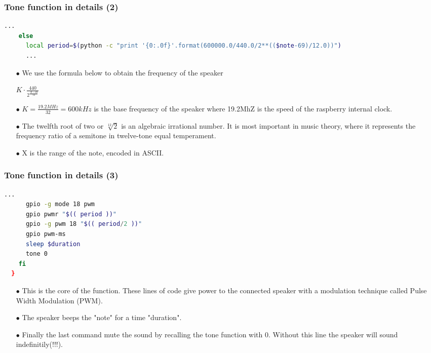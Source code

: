\documentclass{beamer}
\begin{document}

\begin{frame}[fragile]
	\frametitle{\textbf{Tone function in details (2)}}
  \begin{lstlisting}[language=bash]
    ...
    else
      local period=$(python -c "print '{0:.0f}'.format(600000.0/440.0/2**(($note-69)/12.0))")
      ...
  \end{lstlisting}
  \begin{itemize}
  	\item[$\bullet$] We use the formula below to obtain the frequency of the speaker
  	
  	\begin{center}
  			$K\cdot\frac{440}{2^{\frac{X-69}{12}}}$
  	\end{center}
  		
  	
  	\item[$\bullet$] $K =\frac{19.2MHz}{32} = 600kHz$ is the base frequency of the speaker where 19.2MhZ is the speed of the raspberry internal clock.
  	\item[$\bullet$] The twelfth root of two or $\sqrt[12]{2}$ is an algebraic irrational number. It is most important in music theory, where it represents the frequency ratio of a semitone in twelve-tone equal temperament.
  	\item[$\bullet$] X is the range of the note, encoded in ASCII.
  \end{itemize}
\end{frame}



\begin{frame}[fragile]
	\frametitle{\textbf{Tone function in details (3)}}
  \begin{lstlisting}[language=bash]
      ...
      gpio -g mode 18 pwm
      gpio pwmr "$(( period ))"
      gpio -g pwm 18 "$(( period/2 ))"
      gpio pwm-ms
      sleep $duration
      tone 0
    fi
  }
  \end{lstlisting}
  \begin{itemize}
  \item[$\bullet$] This is the core of the function. These lines of code give power to the connected speaker with a modulation technique called Pulse Width Modulation (PWM).
  \item[$\bullet$] The speaker beeps the "note" for a time "duration".
  \item[$\bullet$] Finally the last command mute the sound by recalling the tone function with 0. Without this line the speaker will sound indefinitily(!!!).
  \end{itemize}
\end{frame}
\end{document}
